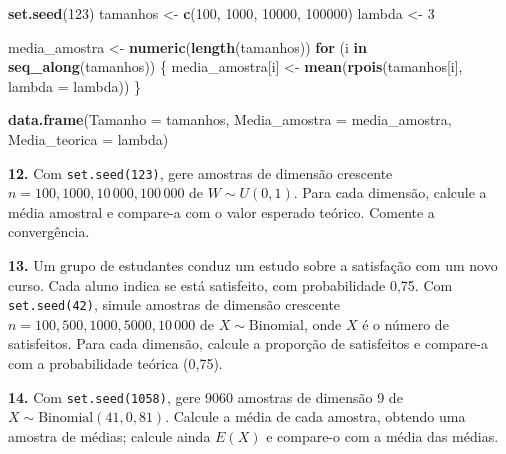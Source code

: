 \documentclass[
  portuguese,
  11pt,
  openany]{book}
\newenvironment{Shaded}{\begin{snugshade}}{\end{snugshade}}
\newcommand{\AttributeTok}[1]{\textcolor[rgb]{0.13,0.29,0.53}{#1}}
\newcommand{\ControlFlowTok}[1]{\textcolor[rgb]{0.13,0.29,0.53}{\textbf{#1}}}
\newcommand{\DecValTok}[1]{\textcolor[rgb]{0.00,0.00,0.81}{#1}}
\newcommand{\FunctionTok}[1]{\textcolor[rgb]{0.13,0.29,0.53}{\textbf{#1}}}
\newcommand{\NormalTok}[1]{#1}
\newcommand{\OtherTok}[1]{\textcolor[rgb]{0.56,0.35,0.01}{#1}}
\begin{document}
\begin{Shaded}
\begin{Highlighting}[]
\FunctionTok{set.seed}\NormalTok{(}\DecValTok{123}\NormalTok{)}
\NormalTok{tamanhos }\OtherTok{\textless{}{-}} \FunctionTok{c}\NormalTok{(}\DecValTok{100}\NormalTok{, }\DecValTok{1000}\NormalTok{, }\DecValTok{10000}\NormalTok{, }\DecValTok{100000}\NormalTok{)}
\NormalTok{lambda }\OtherTok{\textless{}{-}} \DecValTok{3}

\NormalTok{media\_amostra }\OtherTok{\textless{}{-}} \FunctionTok{numeric}\NormalTok{(}\FunctionTok{length}\NormalTok{(tamanhos))}
\ControlFlowTok{for}\NormalTok{ (i }\ControlFlowTok{in} \FunctionTok{seq\_along}\NormalTok{(tamanhos)) \{}
\NormalTok{  media\_amostra[i] }\OtherTok{\textless{}{-}} \FunctionTok{mean}\NormalTok{(}\FunctionTok{rpois}\NormalTok{(tamanhos[i], }\AttributeTok{lambda =}\NormalTok{ lambda))}
\NormalTok{\}}

\FunctionTok{data.frame}\NormalTok{(}\AttributeTok{Tamanho =}\NormalTok{ tamanhos, }\AttributeTok{Media\_amostra =}\NormalTok{ media\_amostra, }\AttributeTok{Media\_teorica =}\NormalTok{ lambda)}
\end{Highlighting}
\end{Shaded}

\textbf{12.} Com \texttt{set.seed(123)}, gere amostras de dimensão crescente
\(n = 100, 1000, 10\,000, 100\,000\) de \(W \sim U(0, 1)\). Para cada dimensão, calcule a
média amostral e compare-a com o valor esperado teórico. Comente a convergência.

\textbf{13.} Um grupo de estudantes conduz um estudo sobre a satisfação com um novo curso.
Cada aluno indica se está satisfeito, com probabilidade 0,75. Com \texttt{set.seed(42)}, simule
amostras de dimensão crescente \(n = 100, 500, 1000, 5000, 10\,000\) de
\(X \sim \text{Binomial}\), onde \(X\) é o número de satisfeitos. Para cada dimensão,
calcule a proporção de satisfeitos e compare-a com a probabilidade teórica (0,75).

\textbf{14.} Com \texttt{set.seed(1058)}, gere 9060 amostras de dimensão 9 de
\(X \sim \text{Binomial}(41, 0{,}81)\). Calcule a média de cada amostra, obtendo uma
amostra de médias; calcule ainda \(E(X)\) e compare-o com a média das médias.
\end{document}
